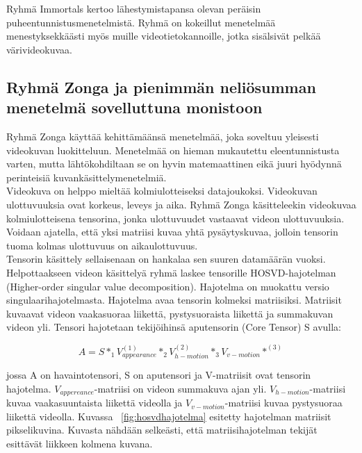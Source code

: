 Ryhmä Immortals kertoo lähestymistapansa olevan peräisin puheentunnistusmenetelmistä. Ryhmä on kokeillut menetelmää menestyksekkäästi 
myös muille videotietokannoille, jotka sisälsivät pelkää värivideokuvaa. \citep{firstround}\\


\subsection{Ryhmä Zonga ja pienimmän neliösumman menetelmä sovelluttuna monistoon}
Ryhmä Zonga käyttää kehittämäänsä menetelmää, joka soveltuu yleisesti videokuvan luokitteluun. 
Menetelmää on hieman mukautettu eleentunnistusta varten, mutta lähtökohdiltaan se on hyvin 
matemaattinen eikä juuri hyödynnä perinteisiä kuvankäsittelymenetelmiä. \citep {6239180}\\

Videokuva on helppo mieltää kolmiulotteiseksi datajoukoksi. Videokuvan ulottuvuuksia ovat korkeus, leveys ja aika.
Ryhmä Zonga käsitteleekin videokuvaa kolmiulotteisena tensorina, jonka ulottuvuudet vastaavat videon ulottuvuuksia.
Voidaan ajatella, että yksi matriisi kuvaa yhtä pysäytyskuvaa, jolloin tensorin tuoma kolmas ulottuvuus on aikaulottuvuus. \citep {6239180}\\

Tensorin käsittely sellaisenaan on hankalaa sen suuren datamäärän vuoksi. Helpottaakseen videon käsittelyä
ryhmä laskee tensorille HOSVD-hajotelman (Higher-order singular value decomposition). Hajotelma on muokattu versio
singulaarihajotelmasta. Hajotelma avaa tensorin kolmeksi matriisiksi.
Matriisit kuvaavat videon vaakasuoraa liikettä, pystysuoraista liikettä ja summakuvan videon yli. \citep {HOSVD} 
Tensori hajotetaan tekijöihinsä aputensorin (Core Tensor) S avulla:

\begin{equation}
A = S *_{1} V_{appearance}^{(1)} *_{2} V_{h-motion}^{(2)} *_{3} V_{v-motion}*^{(3)}
\end{equation}

jossa A on havaintotensori, S on aputensori ja V-matriisit ovat tensorin hajotelma. $V_{appereance}$-matriisi on
videon summakuva ajan yli. $V_{h-motion}$-matriisi kuvaa vaakasuuntaista liikettä videolla ja $V_{v-motion}$-matriisi
kuvaa pystysuoraa liikettä videolla. Kuvassa ~\ref{fig:hosvdhajotelma} esitetty hajotelman matriisit pikselikuvina.
Kuvasta nähdään selkeästi, että matriisihajotelman tekijät esittävät liikkeen kolmena kuvana. \citep {6239180}\\

